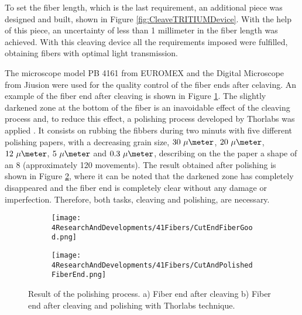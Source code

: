 To set the fiber length, which is the last requirement, an additional piece was designed and built, shown in Figure \ref{fig:CleaveTRITIUMDevice}. With the help of this piece, an uncertainty of less than 1 millimeter in the fiber length was achieved. With this cleaving device all the requirements imposed were fulfilled, obtaining fibers with optimal light transmission. 

The microscope model PB 4161 from EUROMEX and the Digital Microscope from Jiusion were used for the quality control of the fiber ends after celaving. An example of the fiber end after cleaving is shown in Figure \ref{subfig:CleaveFiberEnd}. The slightly darkened zone at the bottom of the fiber is an inavoidable effect of the cleaving process and, to reduce this effect, a polishing process developed by Thorlabs was applied \cite{DiamondThorlabs}. It consists on rubbing the fibbers during two minuts with five different polishing papers, with a decreasing grain size, $30~\mu\meter$, $20~\mu\meter$, $12~\mu\meter$, $5~\mu\meter$ and $0.3~\mu\meter$, describing on the the paper a shape of an 8 (approximately 120 movements). The result obtained after polishing is shown in Figure \ref{subfig:PolishFiberEnd}, where it can be noted that the darkened zone has completely disappeared and the fiber end is completely clear without any damage or imperfection. Therefore, both tasks, cleaving and polishing,  are necessary.

\begin{figure}
\centering
    \begin{subfigure}[b]{0.5\textwidth}
    \centering
    \texttt{[image: 4ResearchAndDevelopments/41Fibers/CutEndFiberGood.png]}  
    \caption{\label{subfig:CleaveFiberEnd}}
    \end{subfigure}
    \hfill
    \begin{subfigure}[b]{0.45\textwidth}
    \centering
    \texttt{[image: 4ResearchAndDevelopments/41Fibers/CutAndPolishedFiberEnd.png]}  
    \caption{\label{subfig:PolishFiberEnd}}
    \end{subfigure}
 \caption{Result of the polishing process. a) Fiber end after cleaving b) Fiber end after cleaving and polishing with Thorlabs technique.}
 \label{fig:ResultofPolishingProcess}
\end{figure}